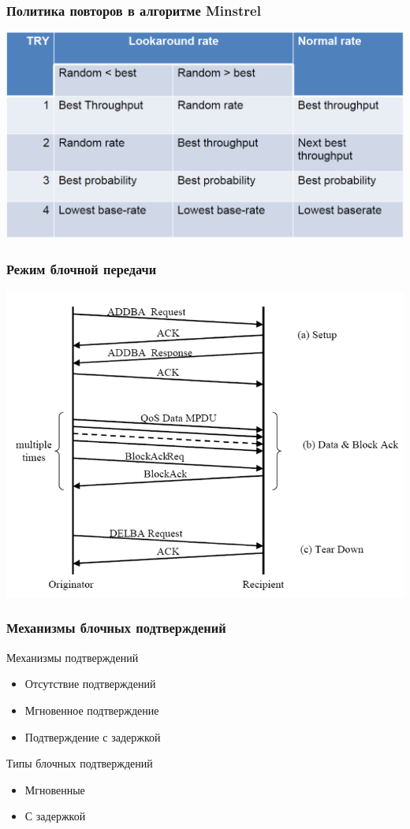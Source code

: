 \documentclass[utf8]{beamer}
\begin{document}
\begin{frame}
\frametitle {Политика повторов в алгоритме Minstrel}
\begin{center}
 \includegraphics[width=\textwidth]{pic/minstrel.png}
\end{center}
\end{frame}
\begin{frame}
\frametitle{Режим блочной передачи}
\begin{center}
 \includegraphics[width=\textwidth]{pic/bloack-ack.png}
\end{center}
\end{frame}
\begin{frame}
\frametitle{Механизмы блочных подтверждений}
\begin{block}{Механизмы подтверждений}
 \begin{itemize}
  \item Отсутствие подтверждений
  \item Мгновенное подтверждение
  \item Подтверждение с задержкой
 \end{itemize}
\end{block}
\begin{block}{Типы блочных подтверждений}
 \begin{itemize}
  \item Мгновенные
  \item С задержкой
 \end{itemize}
\end{block}
\end{frame}
\end{document}
